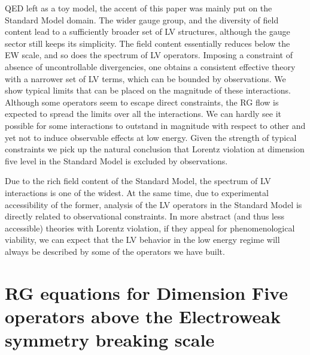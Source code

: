 \documentclass[12pt]{revtex4}
\begin{document}
	QED left as a toy model,
	the accent of this paper was mainly put on the Standard Model 
	domain.
	The wider gauge group, and the diversity of field content lead
	to a sufficiently broader set of LV structures, although the gauge
	sector still keeps its simplicity.
	The field content essentially reduces below the EW scale,
	and so does the spectrum of LV operators.
	Imposing a constraint of absence of uncontrollable divergencies,
	one obtains a consistent effective theory with a narrower set of LV terms, which 
	can be bounded by observations.
	We show typical limits that can be placed on the magnitude of these
	interactions.
	Although some operators seem to escape direct constraints, the RG
	flow is expected to spread the limits over all the interactions.
	We can hardly see it possible for some interactions to outstand in magnitude 
	with respect to other and yet not to induce observable effects at low
	energy. 
	Given the strength of typical constraints we pick up the natural 
	conclusion that Lorentz violation at dimension five level in the Standard
	Model is excluded by observations.

	Due to the rich field content of the Standard Model,
	the spectrum of LV interactions is one of the widest.
	At the same time, due to experimental accessibility of the
	former, analysis of the LV operators in the
	Standard Model is directly related to observational constraints.
	In more abstract (and thus less accessible) theories with Lorentz violation, 
	if they appeal for phenomenological
	viability, we can expect that the LV behavior in the low energy regime will 
	always be described by some of the operators we have built.


\newpage
%
%
\appendix
\section{RG equations for Dimension Five operators 
	above the Electroweak symmetry breaking scale}
\label{RG_SM}
\end{document}
